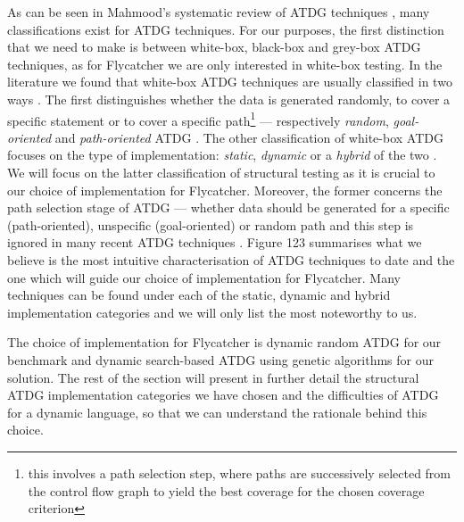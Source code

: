 \documentclass[a4paper,11pt,titlepage]{report}
\begin{document}
As can be seen in Mahmood's systematic review of ATDG techniques \cite{mahmood2007systematic}, many classifications exist for ATDG techniques. For our purposes, the first distinction that we need to make is between white-box, black-box and grey-box ATDG techniques, as for Flycatcher we are only interested in white-box testing. In the literature we found that white-box ATDG techniques are usually classified in two ways \cite{mahmood2007systematic, edvardsson1999survey, tahbildar2automated}. The first distinguishes whether the data is generated randomly, to cover a specific statement or to cover a specific path\footnote{this involves a path selection step, where paths are successively selected from the control flow graph to yield the best coverage for the chosen coverage criterion} --- respectively \emph{random}, \emph{goal-oriented} and \emph{path-oriented} ATDG \cite{edvardsson1999survey}. The other classification of white-box ATDG focuses on the type of implementation: \emph{static}, \emph{dynamic} or a \emph{hybrid} of the two \cite{han2008empirical, mcminn2004search}. We will focus on the latter classification of structural testing as it is crucial to our choice of implementation for Flycatcher. Moreover, the former concerns the path selection stage of ATDG --- whether data should be generated for a specific (path-oriented), unspecific (goal-oriented) or random path and this step is ignored in many recent ATDG techniques \cite{tahbildar2automated}. Figure 123 summarises what we believe is the most intuitive characterisation of ATDG techniques to date and the one which will guide our choice of implementation for Flycatcher. Many techniques can be found under each of the static, dynamic and hybrid implementation categories and we will only list the most noteworthy to us.

The choice of implementation for Flycatcher is dynamic random ATDG for our benchmark and dynamic search-based ATDG using genetic algorithms for our solution. The rest of the section will present in further detail the structural ATDG implementation categories we have chosen and the difficulties of ATDG for a dynamic language, so that we can understand the rationale behind this choice.

\end{document}
